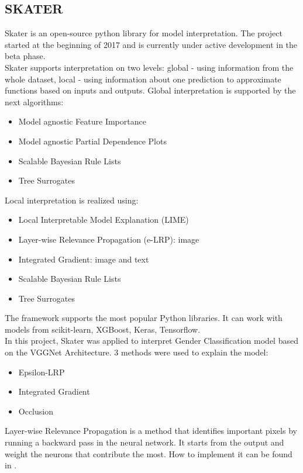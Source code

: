 \subsection{SKATER}
Skater is an open-source python library for model interpretation. The project started at the beginning of 2017 and is currently under active development in the beta phase. \\
Skater supports interpretation on two levels: global - using information from the whole dataset, local - using information about one prediction to approximate functions based on inputs and outputs. Global interpretation is supported by the next algorithms:
\begin{itemize}
    \item Model agnostic Feature Importance
    \item Model agnostic Partial Dependence Plots
    \item Scalable Bayesian Rule Lists
    \item Tree Surrogates
\end{itemize}
Local interpretation is realized using:
\begin{itemize}
    \item Local Interpretable Model Explanation (LIME)
    \item Layer-wise Relevance Propagation (e-LRP): image
    \item Integrated Gradient: image and text
    \item Scalable Bayesian Rule Lists
    \item Tree Surrogates
\end{itemize}
The framework supports the most popular Python libraries. It can work with models from scikit-learn, XGBoost, Keras, Tensorflow. \\
In this project, Skater was applied to interpret Gender Classification model based on the VGGNet Architecture. 3 methods were used to explain the model:
\begin{itemize}
    \item Epsilon-LRP
    \item Integrated Gradient
    \item Occlusion
\end{itemize}

Layer-wise Relevance Propagation is a method that identifies important pixels by running a backward pass in the neural network. It starts from the output and weight the neurons that contribute the most. How to implement it can be found in \cite{LRP_Implementation}. \\

